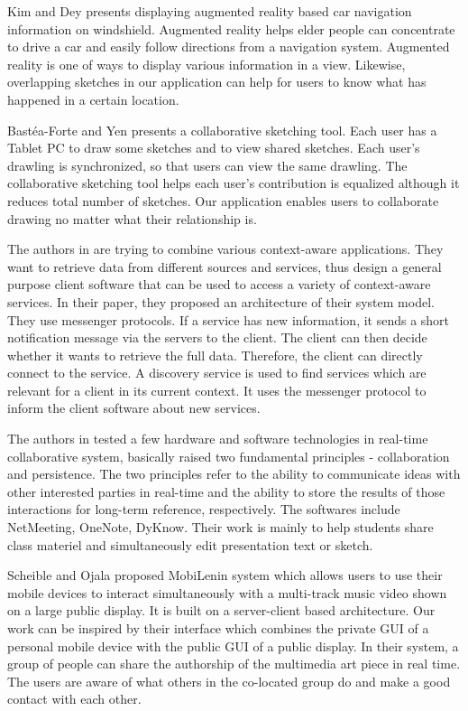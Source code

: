 \documentclass{chi2009}
\begin{document}
Kim and Dey \cite{augmented_reality:kim} presents displaying augmented reality
based car navigation information on windshield. Augmented reality helps elder
people can concentrate to drive a car and easily follow directions from a
navigation system. Augmented reality is one of ways to display various
information in a view. Likewise, overlapping sketches in our application can help for users to
know what has happened in a certain location.

Bast\'{e}a-Forte and Yen \cite{brainstorming:marcello} presents a collaborative
sketching tool. Each user has a Tablet PC to draw some sketches and to view
shared sketches. Each user's drawling is synchronized, so that users can view
the same drawling. The collaborative sketching tool helps each user's
contribution is equalized although it reduces total number of sketches. Our
application enables users to collaborate drawing no matter what their
relationship is.

The authors in \cite{context:weis} are trying to combine various context-aware
applications. They want to retrieve data from different sources and services,
thus design a general purpose client software that can be used to access a
variety of context-aware services. In their paper, they proposed an
architecture of their system model. They use messenger protocols. If a service
has new information, it sends a short notification message via the servers to
the client. The client can then decide whether it wants to retrieve the full
data. Therefore, the client can directly connect to the service. A discovery
service is used to find services which are relevant for a client in its current
context. It uses the messenger protocol to inform the client software about new
services.

 The authors in \cite{ink:lindell} tested a few hardware and software
technologies in real-time collaborative system, basically raised two
fundamental principles - collaboration and persistence. The two principles
refer to the ability to communicate ideas with other interested parties in
real-time and the ability to store the results of those interactions for
long-term reference, respectively. The softwares include NetMeeting, OneNote,
DyKnow. Their work is mainly to help students share class materiel and
simultaneously edit presentation text or  sketch.

Scheible and Ojala \cite{mobilenin:scheible} proposed MobiLenin system which allows users to use their mobile devices to interact simultaneously with a multi-track music video shown on a large public display. It is built on a server-client based architecture. Our work can be inspired by their interface which combines the private GUI of a personal mobile device with the public GUI of a public display. In their system, a group of people can share the authorship of the multimedia art piece in real time. The users are aware of what others in the co-located group do and make a good contact with each other.
\end{document}
